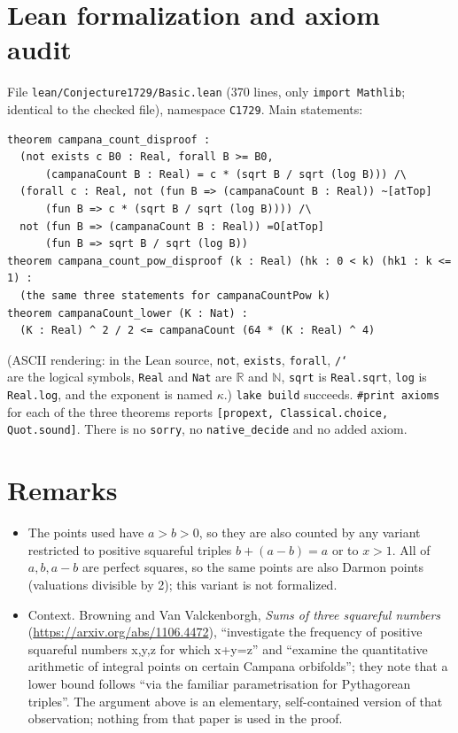 \documentclass[11pt]{article}
\theoremstyle{definition}
\begin{document}
\section{Lean formalization and axiom audit}

File \texttt{lean/Conjecture1729/Basic.lean} (370 lines, only \texttt{import Mathlib}; identical to the
checked file), namespace \texttt{C1729}. Main statements:
\begin{verbatim}
theorem campana_count_disproof :
  (not exists c B0 : Real, forall B >= B0,
      (campanaCount B : Real) = c * (sqrt B / sqrt (log B))) /\
  (forall c : Real, not (fun B => (campanaCount B : Real)) ~[atTop]
      (fun B => c * (sqrt B / sqrt (log B)))) /\
  not (fun B => (campanaCount B : Real)) =O[atTop]
      (fun B => sqrt B / sqrt (log B))
theorem campana_count_pow_disproof (k : Real) (hk : 0 < k) (hk1 : k <= 1) :
  (the same three statements for campanaCountPow k)
theorem campanaCount_lower (K : Nat) :
  (K : Real) ^ 2 / 2 <= campanaCount (64 * (K : Real) ^ 4)
\end{verbatim}
(ASCII rendering: in the Lean source, \texttt{not}, \texttt{exists}, \texttt{forall}, \texttt{/\char`\\}
are the logical symbols, \texttt{Real} and \texttt{Nat} are $\mathbb{R}$ and $\mathbb{N}$,
\texttt{sqrt} is \texttt{Real.sqrt}, \texttt{log} is \texttt{Real.log}, and the exponent is named
$\kappa$.)
\texttt{lake build} succeeds. \texttt{\#print axioms} for each of the three theorems reports
\texttt{[propext, Classical.choice, Quot.sound]}. There is no \texttt{sorry}, no
\texttt{native\_decide} and no added axiom.

\section{Remarks}

\begin{itemize}
\item The points used have $a>b>0$, so they are also counted by any variant restricted to positive
squareful triples $b+(a-b)=a$ or to $x>1$. All of $a,b,a-b$ are perfect squares, so the same points
are also Darmon points (valuations divisible by 2); this variant is not formalized.
\item Context. Browning and Van Valckenborgh, \emph{Sums of three squareful numbers}
(\url{https://arxiv.org/abs/1106.4472}), ``investigate the frequency of positive squareful numbers
x,y,z for which x+y=z'' and ``examine the quantitative arithmetic of integral points on certain
Campana orbifolds''; they note that a lower bound follows ``via the familiar parametrisation for
Pythagorean triples''. The argument above is an elementary, self-contained version of that
observation; nothing from that paper is used in the proof.
\end{itemize}
\end{document}
